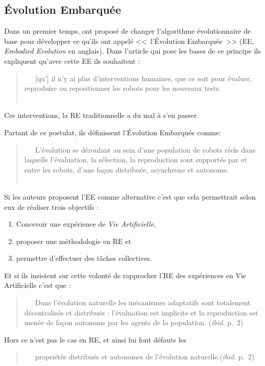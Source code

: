 \subsection{\'Evolution Embarquée}
Dans un premier temps, \cite{watson02embodiedevolutiondistributingevolutionaryalgorithmpopulationrobots} ont proposé de changer l'algorithme évolutionnaire de base pour développer ce qu'ils ont appelé <<~l'\'Evolution Embarquée~>> (EE, \emph{Embodied Evolution} en anglais). Dans l'article qui pose les bases de ce principe ils expliquent qu'avec cette EE ils souhaitent :
\begin{quote}
   [qu'] il n'y ai plus d'interventions humaines, que ce soit pour évaluer, reproduire ou repositionner les robots pour les nouveaux tests.\\
   \citep[p.~1]{watson02embodiedevolutiondistributingevolutionaryalgorithmpopulationrobots}
\end{quote}
Ces interventions, la RE traditionnelle a du mal à s'en passer.

Partant de ce postulat, ils définissent l'\'Evolution Embarquée comme:
\begin{quotation}
   L'évolution se déroulant au sein d'une population de robots réels dans laquelle l'évaluation, la sélection, la reproduction sont supportés par et entre les robots, d'une façon distribuée, asynchrone et autonome.\\
   \citep[p.~2]{watson02embodiedevolutiondistributingevolutionaryalgorithmpopulationrobots}
\end{quotation}

Si les auteurs proposent l'EE comme alternative c'est que cela permettrait selon eux de réaliser trois objectifs :
\begin{enumerate}
\item Concevoir une expérience de \emph{Vie Artificielle},
\item proposer une méthodologie en RE et
\item permettre d'effectuer des tâches collectives.
\end{enumerate}

Et si ils insistent sur cette volonté de rapprocher l'RE des expériences en Vie Artificielle c'est que :
\begin{quote}
   Dans l'évolution naturelle les mécanismes adaptatifs sont totalement décentralisés et distribués : l'évaluation est implicite et la reproduction est menée de façon autonome par les agents de la population. (\emph{ibid.} p.~2)
\end{quote}
Hors ce n'est pas le cas en RE, et ainsi lui font défauts les
\begin{quote}
   propriétés distribués et autonomes de l'évolution naturelle.(\emph{ibid.} p.~2)
\end{quote}


